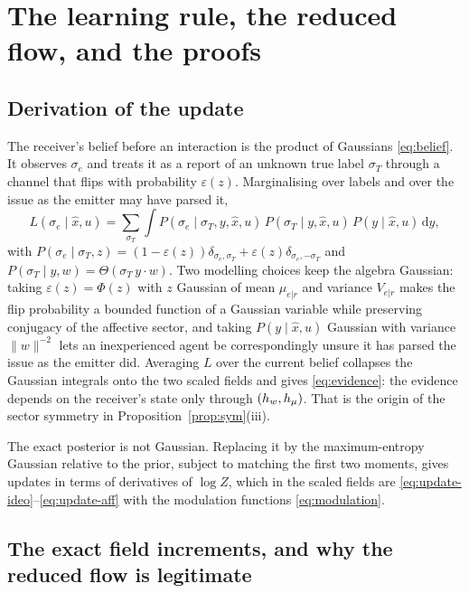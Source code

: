 \section{The learning rule, the reduced flow, and the proofs}
\label{app:derivation}

\subsection{Derivation of the update}

The receiver's belief before an interaction is the product of Gaussians
\eqref{eq:belief}. It observes $\sigma_e$ and treats it as a report of an unknown
true label $\sigma_T$ through a channel that flips with probability
$\varepsilon(z)$. Marginalising over labels and over the issue as the emitter may
have parsed it,
%
\begin{equation}
  L(\sigma_e\mid \hat{x}, u) =
  \sum_{\sigma_T}\int P(\sigma_e\mid \sigma_T, y, \hat{x}, u)\,
  P(\sigma_T\mid y, \hat{x}, u)\,P(y\mid \hat{x}, u)\,\mathrm{d}y ,
\end{equation}
%
with $P(\sigma_e\mid\sigma_T,z)=(1-\varepsilon(z))\delta_{\sigma_e,\sigma_T} +
\varepsilon(z)\delta_{\sigma_e,-\sigma_T}$ and
$P(\sigma_T\mid y,w)=\Theta(\sigma_T\,y\cdot w)$. Two modelling choices keep the
algebra Gaussian: taking $\varepsilon(z)=\Phi(z)$ with $z$ Gaussian of mean
$\mu_{e|r}$ and variance $V_{e|r}$ makes the flip probability a bounded function
of a Gaussian variable while preserving conjugacy of the affective sector, and
taking $P(y\mid\hat{x},u)$ Gaussian with variance $\|w\|^{-2}$ lets an
inexperienced agent be correspondingly unsure it has parsed the issue as the
emitter did. Averaging $L$ over the current belief collapses the Gaussian
integrals onto the two scaled fields and gives \eqref{eq:evidence}: the evidence
depends on the receiver's state only through $(h_{w},h_{\mu})$. That is the origin of
the sector symmetry in Proposition~\ref{prop:sym}(iii).

The exact posterior is not Gaussian. Replacing it by the maximum-entropy
Gaussian relative to the prior, subject to matching the first two moments, gives
updates in terms of derivatives of $\log Z$, which in the scaled fields are
\eqref{eq:update-ideo}--\eqref{eq:update-aff} with the modulation functions
\eqref{eq:modulation}.

\subsection{The exact field increments, and why the reduced flow is legitimate}
\label{app:reduced}

